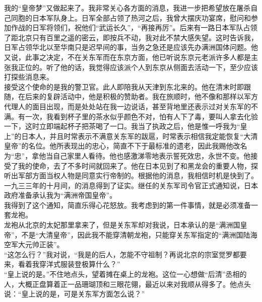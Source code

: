 我的“皇帝梦”又做起来了。我非常关心各方面的消息，我进一步把希望放在屠杀自己同胞的日本军队身上。日军全部占领了热河之后，我曾大摆庆功宴席，慰问和参加作战的日军将领们，祝他们“武运长久”，“再接再厉”。后来有一路日本军队占领了距北京只有百里之遥的密云，即按兵不动，我对此不禁大感失望。这时告诉我，日军占领华北以至华南只是迟早间的事，当务之急还是应该先办满洲国体问题。他又说，此事之决定，不在关东军而在东京方面，他已听说东京元老派许多人都是主张我正位的。听了他的话，我觉得应该派个人到东京从侧面去活动一下，至少应该打探些消息来。\\

接受这个使命的是我的警卫官。此人即陪我从天津到东北来的。他在清末时即跟随，在后来的复辟活动中，他是积极的赞助者。我在旅顺时，他不像和那样以军方代理人的面目出现，而是处处站在我一边说话，甚至背地里还表示过对关东军的不满。有一次，我看到杯子里的茶水似乎颜色不对，怕有人下了毒，要叫人拿去化验一下，这时立即端起杯子把茶喝了一口。我当了执政之后，他是惟一呼我为“皇上”的日本人，并且时常表示不满意关东军的跋扈，时常表示相信我定能恢复“大清皇帝”的名位。他所表现出的忠心，简直不下于最标准的遗老，因此我赐他改名为“忠”，拿他当自己家里人看待。他也感激涕零地表示誓死效忠，永世不变。他接受了我的使命，去了不多时间就回来了。他在日本见到了和黑龙会的重要人物，探听出军部方面当权人物是同意实行帝制的。根据他的消息，我相信时机是快到了。\\

一九三三年的十月间，的消息得到了证实。继任的关东军司令官正式通知说，日本政府准备承认我为“满洲帝国皇帝”。\\

我得到了这个通知，简直乐得心花怒放。我考虑到的第一件事情，就是必须准备一套龙袍。\\

龙袍从北京的太妃那里拿来了，但是关东军却对我说，日本承认的是“满洲国皇帝”，不是“大清皇帝”，因此我不能穿清朝龙袍，只能穿关东军指定的“满洲国陆海空军大元帅正装”。\\

“这怎么行？”我对说，“我是的后人，怎能不守祖制？再说北京的宗室觉罗都要来，看着我穿洋式服装登极算什么？”\\

“皇上说的是。”不住地点头，望着摊在桌上的龙袍。这位一心想做“后清”丞相的人，大概正盘算着正一品珊瑚顶和三眼花翎，最近以来对我顺从得多了。他点头说：“皇上说的是，可是关东军方面怎么说？”\\

